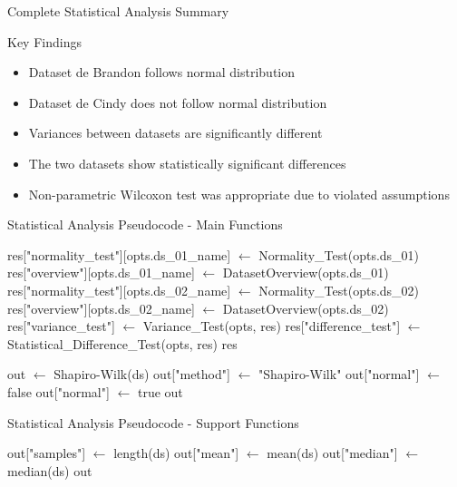 \documentclass[10pt]{beamer}
\begin{document}
{\begin{frame}{Complete Statistical Analysis Summary}
   \vspace{0.5cm}
   \begin{block}{Key Findings}
   \begin{itemize}
   \item Dataset de Brandon follows normal distribution
   \item Dataset de Cindy does not follow normal distribution  
   \item Variances between datasets are significantly different
   \item The two datasets show statistically significant differences
   \item Non-parametric Wilcoxon test was appropriate due to violated assumptions
   \end{itemize}
   \end{block}
   \end{frame}

   \begin{frame}{Statistical Analysis Pseudocode - Main Functions}
   \scriptsize
   \begin{algorithmic}[1]
      \State res["normality\_test"][opts.ds\_01\_name] $\gets$ Normality\_Test(opts.ds\_01)
      \State res["overview"][opts.ds\_01\_name] $\gets$ DatasetOverview(opts.ds\_01)
         \State res["normality\_test"][opts.ds\_02\_name] $\gets$ Normality\_Test(opts.ds\_02)
         \State res["overview"][opts.ds\_02\_name] $\gets$ DatasetOverview(opts.ds\_02)
         \State res["variance\_test"] $\gets$ Variance\_Test(opts, res)
         \State res["difference\_test"] $\gets$ Statistical\_Difference\_Test(opts, res)
      \EndIf
      \State \Return res
   \EndFunction
   
      \State out $\gets$ Shapiro-Wilk(ds)
      \State out["method"] $\gets$ "Shapiro-Wilk"
         \State out["normal"] $\gets$ false
      \Else
         \State out["normal"] $\gets$ true
      \EndIf
      \State \Return out
   \EndFunction
   \end{algorithmic}
   \end{frame}

   \begin{frame}{Statistical Analysis Pseudocode - Support Functions}
   \scriptsize
   \begin{algorithmic}[1]
      \State out["samples"] $\gets$ length(ds)
      \State out["mean"] $\gets$ mean(ds)
      \State out["median"] $\gets$ median(ds)
      \State \Return out
   \EndFunction
   

\end{algorithmic}
\end{frame}}
\end{document}
